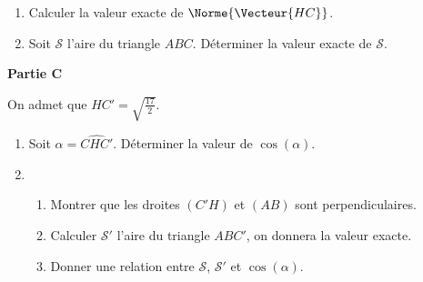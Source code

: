 \begin{enumerate}
	\item Calculer la valeur exacte de $\Norme{\Vecteur{HC}}$.
	\item Soit $\mathcal{S}$ l'aire du triangle $ABC$. Déterminer la valeur exacte de $\mathcal{S}$.
\end{enumerate}

\smallskip

\textbf{Partie C}

\medskip

On admet que $HC' = \sqrt{\frac{17}{2}}$.

\begin{enumerate}
	\item Soit $\alpha = \widehat{CHC'}$. Déterminer la valeur de $\cos(\alpha)$.
	\item 
	\begin{enumerate}
		\item Montrer que les droites $(C'H)$ et $(AB)$ sont perpendiculaires.
		\item Calculer $\mathcal{S}'$ l'aire du triangle $ABC'$, on donnera la valeur exacte.
		\item Donner une relation entre $\mathcal{S}$, $\mathcal{S}'$ et $\cos(\alpha)$.
	\end{enumerate}
\end{enumerate}